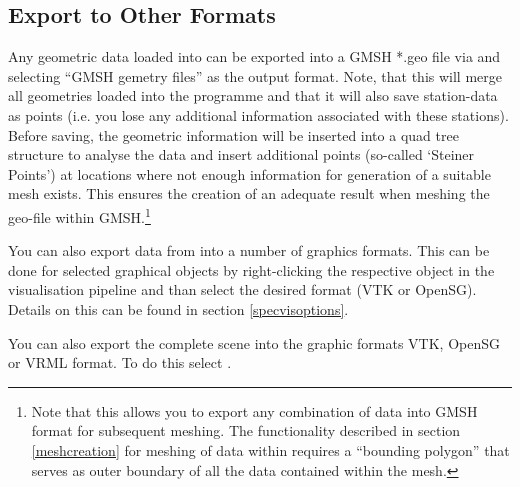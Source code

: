\subsection{Export to Other Formats}

Any geometric data loaded into \ogs can be exported into a GMSH *.geo file via  and selecting ``GMSH gemetry files'' as the output format. Note, that this will merge all geometries loaded into the programme and that it will also save station-data as points (i.e. you lose any additional information associated with these stations). Before saving, the geometric information will be inserted into a quad tree structure to analyse the data and insert additional points (so-called `Steiner Points') at locations where not enough information for generation of a suitable mesh exists. This ensures the creation of an adequate result when meshing the geo-file within GMSH.\footnote{Note that this allows you to export any combination of data into GMSH format for subsequent meshing. The functionality described in section \ref{meshcreation} for meshing of data within \ogs requires a ``bounding polygon'' that serves as outer boundary of all the data contained within the mesh.}

\bigskip

You can also export data from \ogs into a number of graphics formats. This can be done for selected graphical objects by right-clicking the respective object in the visualisation pipeline and than select the desired format (VTK or OpenSG). Details on this can be found in section \ref{specvisoptions}.

You can also export the complete scene into the graphic formats VTK, OpenSG or VRML format. To do this select . 